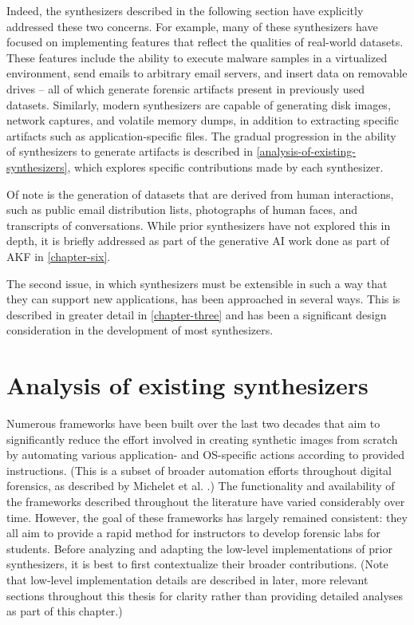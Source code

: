 Indeed, the synthesizers described in the following section have
explicitly addressed these two concerns. For example, many of these
synthesizers have focused on implementing features that reflect the
qualities of real-world datasets. These features include the ability to
execute malware samples in a virtualized environment, send emails to
arbitrary email servers, and insert data on removable drives -- all of
which generate forensic artifacts present in previously used datasets.
Similarly, modern synthesizers are capable of generating disk images,
network captures, and volatile memory dumps, in addition to extracting
specific artifacts such as application-specific files. The gradual
progression in the ability of synthesizers to generate artifacts is
described in \autoref{analysis-of-existing-synthesizers}, which explores specific contributions made by
each synthesizer.

Of note is the generation of datasets that are derived from human
interactions, such as public email distribution lists, photographs of
human faces, and transcripts of conversations. While prior synthesizers
have not explored this in depth, it is briefly addressed as part of the
generative AI work done as part of AKF in \autoref{chapter-six}.

The second issue, in which synthesizers must be extensible in such a way
that they can support new applications, has been approached in several
ways. This is described in greater detail in \autoref{chapter-three} and has been a significant design consideration in the
development of most synthesizers.

\section{Analysis of existing
synthesizers}\label{analysis-of-existing-synthesizers}

Numerous frameworks have been built over the last two decades that aim
to significantly reduce the effort involved in creating synthetic images
from scratch by automating various application- and OS-specific actions
according to provided instructions. (This is a subset of broader
automation efforts throughout digital forensics, as described by
Michelet et al. \cite{micheletAutomationDigitalForensics2023}.) The
functionality and availability of the frameworks described throughout
the literature have varied considerably over time. However, the goal of
these frameworks has largely remained consistent: they all aim to
provide a rapid method for instructors to develop forensic labs for
students. Before analyzing and adapting the low-level implementations of
prior synthesizers, it is best to first contextualize their broader
contributions. (Note that low-level implementation details are described
in later, more relevant sections throughout this thesis for clarity
rather than providing detailed analyses as part of this chapter.)


